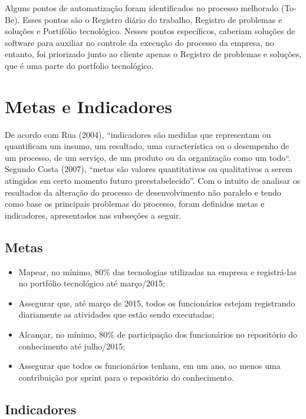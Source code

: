 Alguns pontos de automatização foram identificados no processo melhorado (To-Be). Esses pontos são o Registro diário do trabalho, Registro de problemas e soluções e Portifólio tecnológico. Nesses pontos específicos, caberiam soluções de software para auxiliar no controle da execução do processo da empresa, no entanto, foi priorizado junto ao cliente apenas o Registro de problemas e soluções, que é uma parte do portfolio tecnológico.

\section{Metas e Indicadores}
De acordo com Rua (2004), “indicadores são medidas que representam ou quantificam um insumo, um resultado, uma característica ou o desempenho de um processo, de um serviço, de um produto ou da organização como um todo“. Segundo Costa (2007), “metas são valores quantitativos ou qualitativos a serem atingidos em certo momento futuro preestabelecido”.
Com o intuito de analisar os resultados da alteração do processo de desenvolvimento não paralelo e tendo como base os principais problemas do processo, foram definidos metas e  indicadores, apresentados nas subseções a seguir.

\subsection{Metas}
\begin{itemize}
\item Mapear, no mínimo, 80\% das tecnologias utilizadas na empresa e registrá-las no portfólio tecnológico até março/2015;
\item Assegurar que, até março de 2015, todos os funcionários estejam registrando diariamente as atividades que estão sendo executadas;
\item Alcançar, no mínimo, 80\% de participação dos funcionários no repositório do conhecimento até julho/2015;
\item Assegurar que todos os funcionários tenham, em um ano, ao menos uma contribuição por sprint para o repositório do conhecimento.
\end{itemize}

\subsection{Indicadores}

